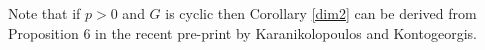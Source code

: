 \begin{rem}
  Note that if $p>0$ and $G$ is cyclic then Corollary \ref{dim2} can be derived from Proposition $6$ in the recent pre-print
 \cite{kako} by Karanikolopoulos and Kontogeorgis.
\end{rem}

\begin{comment}
We also consider an alternative approach to computing the fixed dimension of $H^0(X,\Omega_X^{\otimes m})$, relying on \citep[Thm 4.5]{galoisstruc}.
For the rest of this section we assume that $n$ is co-prime to $p$, that $g_X\geq 2$ and that $g_Y=0$.

We now introduce some notation from \cite{galoisstruc}.
We first denote by $\chi_P$ the representation of the decomposition group $G_P$ on the cotangent space $\mathfrak{m}_P/\mathfrak{m}_P^2$.
We also introduce the unique projective module $N_{G,X}$ satisfying
\begin{equation*}
 \bigoplus^n N_{G,X} = \bigoplus_{P\in X} \bigoplus_{d=1}^{e^t_p-1} \bigoplus^d {\rm Ind}_{G_P}^G(\chi_P^d),
\end{equation*}
where $e^t_p$ denotes the (tame) ramification index at a point $P\in X$, as in \citep[Thm 4.3]{galoisstruc}.

Fix an integer $m\geq 2$. Now if we write $mK_X = \sum_{P\in X} n_P[P]$ then we can define $r_P\in \{0,\ldots, e^t_p - 1\}$ and $s_P\in \ZZ$ to be the unique values such that
\[
 n_P = r_P + s_Pe_P^t.
\]

Finally, if for any $Q\in Y$ we let $\bar Q \in X$ be an element of the fibre with respect to $\pi$, we can state \citep[Thm 4.5]{galoisstruc}, which says that we have the following equality in $K_0(k[G])$:
\begin{equation}\label{eq}
 \chi(G,X,\Omega^{\otimes m}) = -[N_{G,X}] +\sum_{Q\in Y}\sum^{r_{\bar Q}}_{d=1} [{\rm Ind}_{G_{\bar Q}}^G(\chi_{\bar Q}^d)]  + \left( 1 + \sum_{Q\in Y} s_{\bar Q} \right) [k[G]],
\end{equation}
where for any $k[G]$ module $A$ then $[A]$ denotes that class of $A$ in $K_0[k[G]]$.

We wish to find when the action of $G$ on $H^0(X,\Omega^{\otimes m})$ is trivial.
Note that $[H^0(X,\Omega^{\otimes m})]$ is in the same class as $\chi(G,X,\Omega^{\otimes m})$ in $K_0(k[G])$, since $mK_X$ is non-special under our assumptions.
Hence the action will be trivial precisely when we have equality between the dimension and the fixed dimension.
We will work out the dimension and fixed dimension of each of the components of the above sum separately, before combining them to give a complete answer.



\end{comment}
